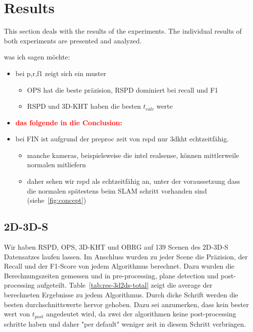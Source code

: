 \documentclass[main.tex]{subfiles}
\begin{document}
\section{Results}
This section deals with the results of the experiments. The individual results of both experiments are presented and analyzed.

was ich sagen möchte:
\begin{itemize}
    \item bei p,r,f1 zeigt sich ein muster
          \begin{itemize}
              \item OPS hat die beste präzision, RSPD dominiert bei recall und F1
              \item RSPD und 3D-KHT haben die besten $t_{calc}$ werte
          \end{itemize}
    \item \textbf{\textcolor{red}{das folgende in die Conclusion:}}
    \item bei FIN ist aufgrund der preproc zeit von rspd nur 3dkht echtzeitfähig.
          \begin{itemize}
              \item manche kameras, beispielsweise die intel realsense, können mittlerweile normalen mitliefern
              \item daher sehen wir rspd als echtzeitfähig an, unter der voraussetzung dass die normalen spätestens beim SLAM schritt vorhanden
                    sind (siehe~\ref{fig:concept})
          \end{itemize}
\end{itemize}

\subsection{2D-3D-S}

Wir haben RSPD, OPS, 3D-KHT und OBRG auf 139 Scenen des 2D-3D-S Datensatzes laufen lassen. Im Anschluss wurden zu jeder Scene die Präzision,
der Recall und der F1-Score von jedem Algorithmus berechnet. Dazu wurden die Berechnungszeiten gemessen und in pre-processing, plane detection und
post-processing aufgeteilt. Table~\ref{tab:res-3d2ds-total} zeigt die average der berechneten Ergebnisse zu jedem Algorithmus. Durch dicke Schrift
werden die besten durchschnittswerte hervor gehoben. Dazu sei anzumerken, dass kein bester wert von $t_{post}$ angedeutet wird, da zwei der algorithmen
keine post-processing schritte haben und daher "per default" weniger zeit in diesem Schritt verbringen.
\end{document}

